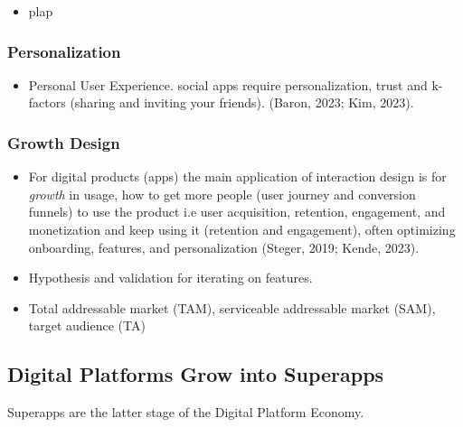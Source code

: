 \documentclass[
  letterpaper,
  DIV=11,
  numbers=noendperiod]{scrartcl}
\providecommand{\tightlist}{%
  \setlength{\itemsep}{0pt}\setlength{\parskip}{0pt}}\usepackage{longtable,booktabs,array}
\begin{document}
\begin{itemize}
\tightlist
\item
  plap
\end{itemize}

\subsubsection{Personalization}\label{personalization}

\begin{itemize}
\tightlist
\item
  Personal User Experience. social apps require personalization, trust
  and k-factors (sharing and inviting your friends). (Baron, 2023; Kim,
  2023).
\end{itemize}

\subsubsection{Growth Design}\label{growth-design}

\begin{itemize}
\item
  For digital products (apps) the main application of interaction design
  is for \emph{growth} in usage, how to get more people (user journey
  and conversion funnels) to use the product i.e user acquisition,
  retention, engagement, and monetization and keep using it (retention
  and engagement), often optimizing onboarding, features, and
  personalization (Steger, 2019; Kende, 2023).
\item
  Hypothesis and validation for iterating on features.
\item
  Total addressable market (TAM), serviceable addressable market (SAM),
  target audience (TA)
\end{itemize}

\subsection{Digital Platforms Grow into
Superapps}\label{digital-platforms-grow-into-superapps}

Superapps are the latter stage of the Digital Platform Economy.
\end{document}
